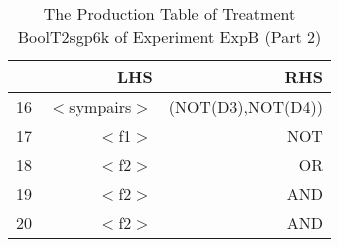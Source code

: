 \begin{table}[ht]
\centering
\begin{tabular}{rrr}
  \hline
 & LHS & RHS \\ 
  \hline
16 & $<$sympairs$>$ & (NOT(D3),NOT(D4)) \\ 
  17 & $<$f1$>$ & NOT \\ 
  18 & $<$f2$>$ & OR \\ 
  19 & $<$f2$>$ & AND \\ 
  20 & $<$f2$>$ & AND \\ 
   \hline
\end{tabular}
\caption{The Production Table of Treatment BoolT2sgp6k of Experiment ExpB (Part 2)} 
\end{table}
